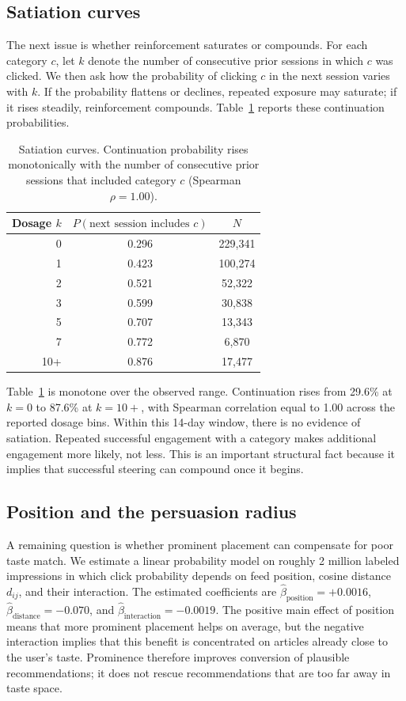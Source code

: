 \documentclass[11pt]{article}
\begin{document}
\subsection{Satiation curves}

The next issue is whether reinforcement saturates or compounds. For each category $c$, let $k$ denote the number of consecutive prior sessions in which $c$ was clicked. We then ask how the probability of clicking $c$ in the next session varies with $k$. If the probability flattens or declines, repeated exposure may saturate; if it rises steadily, reinforcement compounds. Table~\ref{tab:satiation} reports these continuation probabilities.
\begin{table}[ht]
\centering
\caption{Satiation curves. Continuation probability rises monotonically with the number of consecutive prior sessions that included category $c$ (Spearman $\rho = 1.00$).}
\label{tab:satiation}
\begin{tabular}{rcc}
\toprule
Dosage $k$ & $P(\text{next session includes } c)$ & $N$ \\
\midrule
0 & 0.296 & 229,341 \\
1 & 0.423 & 100,274 \\
2 & 0.521 & 52,322 \\
3 & 0.599 & 30,838 \\
5 & 0.707 & 13,343 \\
7 & 0.772 & 6,870 \\
10+ & 0.876 & 17,477 \\
\bottomrule
\end{tabular}
\end{table}
\FloatBarrier

Table~\ref{tab:satiation} is monotone over the observed range. Continuation rises from 29.6\% at $k=0$ to 87.6\% at $k=10+$, with Spearman correlation equal to 1.00 across the reported dosage bins. Within this 14-day window, there is no evidence of satiation. Repeated successful engagement with a category makes additional engagement more likely, not less. This is an important structural fact because it implies that successful steering can compound once it begins.
\subsection{Position and the persuasion radius}

A remaining question is whether prominent placement can compensate for poor taste match. We estimate a linear probability model on roughly 2 million labeled impressions in which click probability depends on feed position, cosine distance $d_{ij}$, and their interaction. The estimated coefficients are $\hat\beta_{\text{position}} = +0.0016$, $\hat\beta_{\text{distance}} = -0.070$, and $\hat\beta_{\text{interaction}} = -0.0019$. The positive main effect of position means that more prominent placement helps on average, but the negative interaction implies that this benefit is concentrated on articles already close to the user's taste. Prominence therefore improves conversion of plausible recommendations; it does not rescue recommendations that are too far away in taste space.
\end{document}
